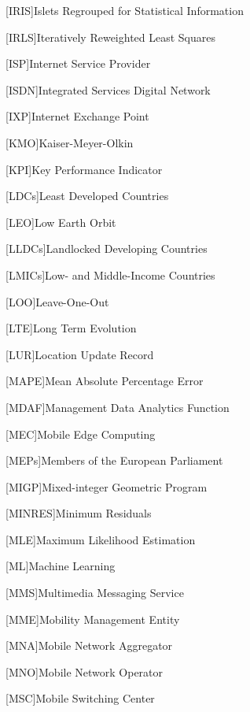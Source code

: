 \begin{acronym}[]
[IRIS]{Islets Regrouped for Statistical Information}

[IRLS]{Iteratively Reweighted Least Squares}

[ISP]{Internet Service Provider}

[ISDN]{Integrated Services Digital Network}

[IXP]{Internet Exchange Point}

[KMO]{Kaiser-Meyer-Olkin}

[KPI]{Key Performance Indicator}

[LDCs]{Least Developed Countries}

[LEO]{Low Earth Orbit}

[LLDCs]{Landlocked Developing Countries}

[LMICs]{Low- and Middle-Income Countries}

[LOO]{Leave-One-Out}

[LTE]{Long Term Evolution}

[LUR]{Location Update Record}

[MAPE]{Mean Absolute Percentage Error}

[MDAF]{Management Data Analytics Function}

[MEC]{Mobile Edge Computing}

[MEPs]{Members of the European Parliament}

[MIGP]{Mixed-integer Geometric Program}

[MINRES]{Minimum Residuals}

[MLE]{Maximum Likelihood Estimation}

[ML]{Machine Learning}

[MMS]{Multimedia Messaging Service}

[MME]{Mobility Management Entity}

[MNA]{Mobile Network Aggregator}

[MNO]{Mobile Network Operator}

[MSC]{Mobile Switching Center}


\end{acronym}

